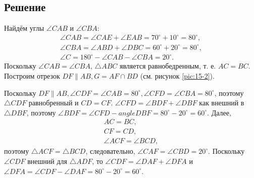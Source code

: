 \documentclass[11pt]{article}
\newcounter{th}\setcounter{th}{0}
\begin{document}
\subsection{Решение}
\label{sec:org70e8be2}
Найдём углы \(\angle CAB\) и \(\angle CBA\):
\begin{gather*}
\angle CAB = \angle CAE + \angle EAB = 70^{\circ} + 10^{\circ} = 80^{\circ}, \\
\angle CBA = \angle ABD + \angle DBC = 60^{\circ} + 20^{\circ} = 80^{\circ}, \\
\angle C = 180^{\circ} - \angle CAB - \angle CBA = 20^{\circ}.
\end{gather*}
Поскольку $\angle CAB = \angle CBA$, $\triangle ABC$ является равнобедренным, т. е. $AC = BC$. Построим отрезок $DF\parallel AB, G = AF\cap BD$ (см. рисунок \ref{pic:15-2}).

Поскольку $DF \parallel AB, \angle CDF = \angle CAB = 80^{\circ}, \angle CFD = \angle CBA = 80^{\circ}$, поэтому $\triangle CDF$ равнобренный и $CD = CF$. $\angle CFD = \angle BDF + \angle DBF$ как внешний в $\triangle DBF$, поэтому $\angle BDF = \angle CFD - angle DBF = 80^{\circ} - 20^{\circ} = 60^{\circ}$.
Далее,
\begin{gather*}
AC = BC, \\
CF = CD, \\
\angle ACF = \angle BCD,
\end{gather*}
поэтому $\triangle ACF = \triangle BCD$, следовательно, $\angle CAF = \angle CBD = 20^{\circ}$. Поскольку $\angle CDF$ внешний для $\triangle ADF$, то $\angle CDF = \angle DAF + \angle DFA$ и $\angle DFA = \angle CDF - \angle DAF = 80^{\circ} - 20^{\circ} = 60^{\circ}$.
\end{document}
